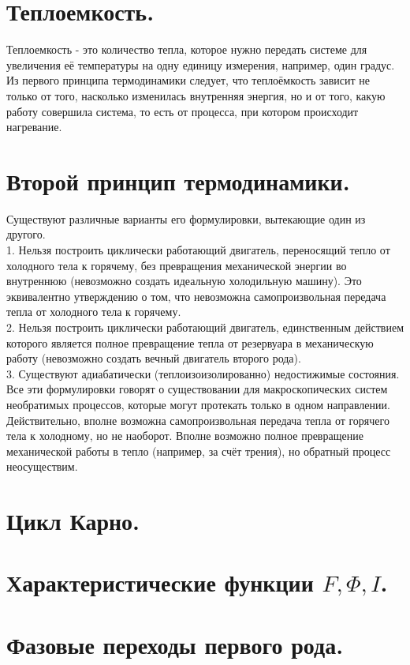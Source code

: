 \begin{multicols*}{2}
		\section{Теплоемкость.}
		Теплоемкость - это количество тепла, которое нужно передать системе для увеличения её температуры на одну единицу измерения, например, один градус. Из первого принципа термодинамики следует, что теплоёмкость зависит не только от того, насколько изменилась внутренняя энергия, но и от того, какую работу совершила система, то есть от процесса, при котором происходит нагревание.

		\section{Второй принцип термодинамики.}
		Существуют различные варианты его формулировки, вытекающие один из другого.\\
		1. Нельзя построить циклически работающий двигатель, переносящий тепло от холодного тела к горячему, без превращения механической энергии во внутреннюю (невозможно создать идеальную холодильную машину). Это эквивалентно утверждению о том, что невозможна самопроизвольная передача тепла от холодного тела к горячему.\\
		2. Нельзя построить циклически работающий двигатель, единственным действием которого является полное превращение тепла от резервуара в механическую работу (невозможно создать вечный двигатель второго рода).\\
		3. Существуют адиабатически (теплоизоизолированно) недостижимые состояния.\\
		Все эти формулировки говорят о существовании для макроскопических систем необратимых процессов, которые могут протекать только в одном направлении. Действительно, вполне возможна самопроизвольная передача тепла от горячего тела к холодному, но не наоборот. Вполне возможно полное превращение механической работы в тепло (например, за счёт трения), но обратный процесс неосуществим.

		\section{Цикл Карно.}

		\section{Характеристические функции $F, \Phi, I$.}

		\section{Фазовые переходы первого рода.}


\end{multicols*}
